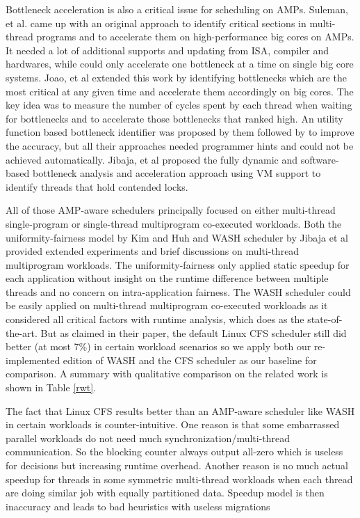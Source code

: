 \documentclass[sigplan,review,anonymous]{acmart}\settopmatter{printfolios=true,printccs=false,printacmref=false}
\begin{document}
Bottleneck acceleration is also a critical issue for scheduling on AMPs. Suleman, et al. \cite{suleman2009accelerating} came up with an original approach to identify critical sections in multi-thread programs and to accelerate them on high-performance big cores on AMPs. It needed a lot of additional supports and updating from ISA, compiler and hardwares, while could only accelerate one bottleneck at a time on single big core systems. Joao, et al \cite{joao2012bottleneck} extended this work by identifying bottlenecks which are the most critical at any given time and accelerate them accordingly on big cores. The key idea was to measure the number of cycles spent by each thread when waiting for bottlenecks and to accelerate those bottlenecks that ranked high. An utility function based bottleneck identifier \cite{joao2013utility} was proposed by them followed by to improve the accuracy, but all their approaches needed programmer hints and could not be achieved automatically. Jibaja, et al \cite{jibaja2016portable} proposed the fully dynamic and software-based bottleneck analysis and acceleration approach using VM support to identify threads that hold contended locks.

All of those AMP-aware schedulers principally focused on either multi-thread single-program or single-thread multiprogram co-executed workloads. Both the uniformity-fairness model by Kim and Huh \cite{kim2018exploring} and WASH scheduler by Jibaja et al \cite{jibaja2016portable} provided extended experiments and brief discussions on multi-thread multiprogram workloads. The uniformity-fairness only applied static speedup for each application without insight on the runtime difference between multiple threads and no concern on intra-application fairness. The WASH scheduler could be easily applied on multi-thread multiprogram co-executed workloads as it considered all critical factors with runtime analysis, which does as the state-of-the-art. But as claimed in their paper, the default Linux CFS scheduler still did better (at most 7\%) in certain workload scenarios so we apply both our re-implemented edition of WASH and the CFS scheduler as our baseline for comparison. A summary with qualitative comparison on the related work is shown in Table \ref{rwt}.

The fact that Linux CFS results better than an AMP-aware scheduler like WASH in certain workloads is counter-intuitive. One reason is that some embarrassed parallel workloads do not need much synchronization/multi-thread communication. So the blocking counter always output all-zero which is useless for decisions but increasing runtime overhead. Another reason is no much actual speedup for threads in some symmetric multi-thread workloads when each thread are doing similar job with equally partitioned data. Speedup model is then inaccuracy and leads to bad heuristics with useless migrations
\end{document}
